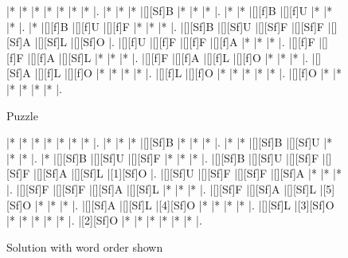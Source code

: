 \documentclass[letterpaper]{article}
\begin{document}
\vspace*{1em}
\begin{figure}[H]
\begin{minipage}{0.4\textwidth}
    \centering
    \begin{Puzzle}{7}{12}
        |*        |*        |*        |*        |*        |*        |*        |.
        |*        |*        |*        |[][Sf]B  |*        |*        |*        |.
        |*        |*        |[][f]B   |[][f]U   |*        |*        |*        |.
        |*        |[][f]B   |[][f]U   |[][f]F   |*        |*        |*        |.
        |[][Sf]B  |[][Sf]U  |[][Sf]F  |[][Sf]F  |[][Sf]A  |[][Sf]L  |[][Sf]O  |.
        |[][f]U   |[][f]F   |[][f]F   |[][f]A   |*        |*        |*        |.
        |[][f]F   |[][f]F   |[][f]A   |[][Sf]L  |*        |*        |*        |.
        |[][f]F   |[][f]A   |[][f]L   |[][f]O   |*        |*        |*        |.
        |[][Sf]A  |[][f]L   |[][f]O   |*        |*        |*        |*        |.
        |[][f]L   |[][f]O   |*        |*        |*        |*        |*        |.
        |[][f]O   |*        |*        |*        |*        |*        |*        |.
        \end{Puzzle}
    \caption*{Puzzle}
\end{minipage}
\hfill
\begin{minipage}{0.4\textwidth}
    \centering
    \begin{Puzzle}{7}{12}
        |*        |*        |*        |*        |*        |*        |*        |.
        |*        |*        |*        |[][Sf]B  |*        |*        |*        |.
        |*        |*        |[][Sf]B  |[][Sf]U  |*        |*        |*        |.
        |*        |[][Sf]B  |[][Sf]U  |[][Sf]F  |*        |*        |*        |.
        |[][Sf]B  |[][Sf]U  |[][Sf]F  |[][Sf]F  |[][Sf]A  |[][Sf]L  |[1][Sf]O |.
        |[][Sf]U  |[][Sf]F  |[][Sf]F  |[][Sf]A  |*        |*        |*        |.
        |[][Sf]F  |[][Sf]F  |[][Sf]A  |[][Sf]L  |*        |*        |*        |.
        |[][Sf]F  |[][Sf]A  |[][Sf]L  |[5][Sf]O |*        |*        |*        |.
        |[][Sf]A  |[][Sf]L  |[4][Sf]O |*        |*        |*        |*        |.
        |[][Sf]L  |[3][Sf]O |*        |*        |*        |*        |*        |.
        |[2][Sf]O |*        |*        |*        |*        |*        |*        |.
        \end{Puzzle}
    \caption*{Solution with word order shown}
\end{minipage}
\end{figure}
\end{document}
